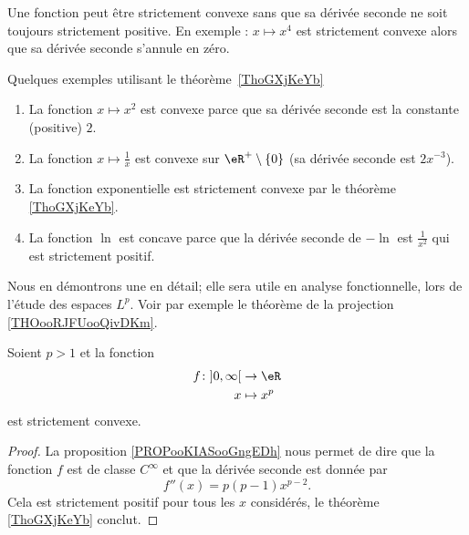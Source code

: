 \begin{remark}      \label{REMooVRPQooIybxmp}
	Une fonction peut être strictement convexe sans que sa dérivée seconde ne soit toujours strictement positive. En exemple : \( x\mapsto x^4\) est strictement convexe alors que sa dérivée seconde s'annule en zéro.
\end{remark}

\begin{example} \label{ExPDRooZCtkOz}
	Quelques exemples utilisant le théorème~\ref{ThoGXjKeYb}
	\begin{enumerate}
		\item
		      La fonction \( x\mapsto x^2\) est convexe parce que sa dérivée seconde est la constante (positive) \( 2\).
		\item
		      La fonction \( x\mapsto\frac{1}{ x }\) est convexe sur \( \eR^+\setminus\{ 0 \}\) (sa dérivée seconde est \( 2x^{-3}\)).
		\item       \label{ITEMooRXSBooDBerbx}
		      La fonction exponentielle est strictement convexe par le théorème \ref{ThoGXjKeYb}.
		\item
		      La fonction \( \ln\) est concave parce que la dérivée seconde de \( -\ln\) est \( \frac{1}{ x^2 }\) qui est strictement positif.
	\end{enumerate}
\end{example}

Nous en démontrons une en détail; elle sera utile en analyse fonctionnelle, lors de l'étude des espaces \( L^p\). Voir par exemple le théorème de la projection \ref{THOooRJFUooQivDKm}.
\begin{lemma}       \label{LEMooSXTXooZOmtKq}
	Soient \( p>1\) et la fonction
	\begin{equation}
		\begin{aligned}
			f\colon \mathopen] 0 , \infty \mathclose[ & \to \eR     \\
			x                                         & \mapsto x^p
		\end{aligned}
	\end{equation}
	est strictement convexe.
\end{lemma}

\begin{proof}
	La proposition \ref{PROPooKIASooGngEDh} nous permet de dire que la fonction \( f\) est de classe \(  C^{\infty}\) et que la dérivée seconde est donnée par
	\begin{equation}
		f''(x)=p(p-1)x^{p-2}.
	\end{equation}
	Cela est strictement positif pour tous les \( x\) considérés, le théorème \ref{ThoGXjKeYb} conclut.
\end{proof}

